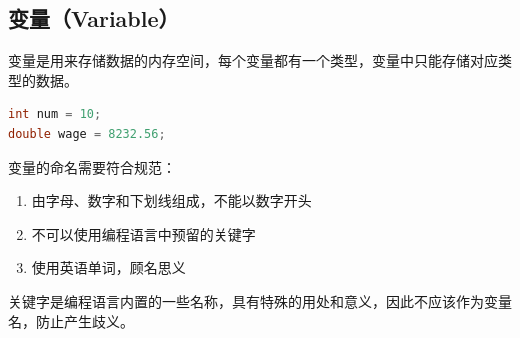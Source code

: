 \vspace{0.5cm}

\subsection{变量（Variable）}

变量是用来存储数据的内存空间，每个变量都有一个类型，变量中只能存储对应类型的数据。

\vspace{-0.5cm}

\begin{lstlisting}[language=C]
int num = 10;
double wage = 8232.56;
\end{lstlisting}

\vspace{0.5cm}

变量的命名需要符合规范：

\begin{enumerate}
	\item 由字母、数字和下划线组成，不能以数字开头
	\item 不可以使用编程语言中预留的关键字
	\item 使用英语单词，顾名思义
\end{enumerate}

关键字是编程语言内置的一些名称，具有特殊的用处和意义，因此不应该作为变量名，防止产生歧义。\\

\begin{table}[H]
	\centering
	\caption{关键字}
\end{table}

\vspace{0.5cm}

